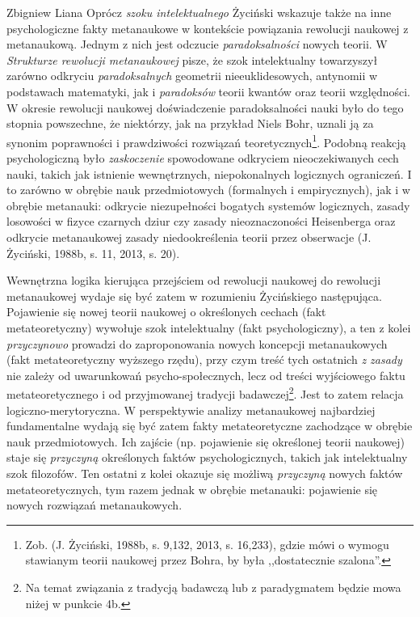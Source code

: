 \begin{artplenv}{Zbigniew Liana}
Oprócz \textit{szoku intelektualnego} Życiński wskazuje także na inne psychologiczne fakty metanaukowe w kontekście
powiązania rewolucji naukowej z metanaukową. Jednym z nich jest odczucie \textit{paradoksalności} nowych teorii. W \textit{Strukturze
rewolucji metanaukowej} pisze, że szok intelektualny towarzyszył zarówno odkryciu
\textit{paradoksalnych} geometrii nieeuklidesowych, antynomii w podstawach matematyki, jak i \textit{paradoksów} teorii
kwantów oraz teorii względności. W okresie rewolucji naukowej doświadczenie paradoksalności nauki było do tego stopnia
powszechne, że niektórzy, jak na przykład Niels Bohr, uznali ją za synonim poprawności i prawdziwości rozwiązań
teoretycznych\footnote{Zob. \label{ref:RNDsmv0TXVWdS}(J. Życiński, 1988b, s. 9,132, 2013, s. 16,233), gdzie mówi o wymogu
stawianym teorii naukowej przez Bohra, by była ,,dostatecznie szalona''.}. Podobną reakcją psychologiczną było
\textit{zaskoczenie} spowodowane odkryciem nieoczekiwanych cech nauki, takich jak istnienie wewnętrznych, niepokonalnych
logicznych ograniczeń. I to zarówno w obrębie nauk przedmiotowych (formalnych i empirycznych), jak i w obrębie
metanauki: odkrycie niezupełności bogatych systemów logicznych, zasady losowości w fizyce czarnych dziur czy zasady
nieoznaczoności Heisenberga oraz odkrycie metanaukowej zasady niedookreślenia teorii przez obserwacje
\label{ref:RND6Rd4uQGI6n}(J. Życiński, 1988b, s. 11, 2013, s. 20).

Wewnętrzna logika kierująca przejściem od rewolucji naukowej do rewolucji metanaukowej wydaje się być zatem w rozumieniu
Życińskiego następująca. Pojawienie się nowej teorii naukowej o określonych cechach (fakt metateoretyczny) wywołuje
szok intelektualny (fakt psychologiczny), a ten z kolei \textit{przyczynowo} prowadzi do zaproponowania nowych koncepcji
metanaukowych (fakt metateoretyczny wyższego rzędu), przy czym treść tych ostatnich \textit{z zasady }nie zależy od
uwarunkowań psycho-społecznych, lecz od treści wyjściowego faktu metateoretycznego i od przyjmowanej tradycji
badawczej\footnote{Na temat związania z tradycją badawczą lub z paradygmatem będzie mowa niżej w punkcie 4b.}. Jest to
zatem relacja logiczno-merytoryczna. W perspektywie analizy metanaukowej najbardziej fundamentalne wydają się być zatem
fakty metateoretyczne zachodzące w obrębie nauk przedmiotowych. Ich zajście (np. pojawienie się określonej teorii
naukowej) staje się \textit{przyczyną} określonych faktów psychologicznych, takich jak intelektualny szok filozofów. Ten
ostatni z kolei okazuje się możliwą \textit{przyczyną} nowych faktów metateoretycznych, tym razem jednak w obrębie
metanauki: pojawienie się nowych rozwiązań metanaukowych.


\end{artplenv}
